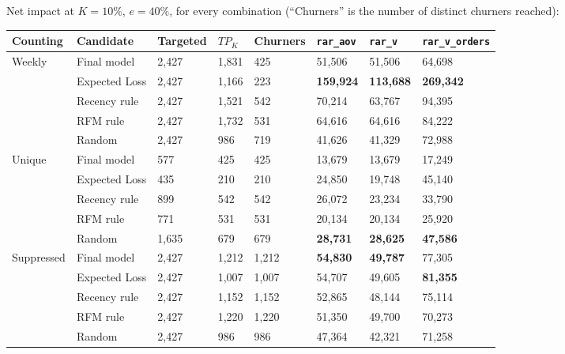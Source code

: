 Net impact at $K=10\%$, $e=40\%$, for every combination (``Churners'' is the number of distinct churners reached):

\begin{center}
\footnotesize
\setlength{\tabcolsep}{4pt}
\begin{tabular}{@{}p{1.6cm}p{2.2cm}p{1.3cm}p{1.1cm}p{1.4cm}p{1.8cm}p{1.8cm}p{2cm}@{}}
    \toprule
    Counting & Candidate & Targeted & $TP_K$ & Churners & \texttt{rar\_aov} & \texttt{rar\_v} & \texttt{rar\_v\_orders} \\
    \midrule
    Weekly & Final model & 2,427 & 1,831 & 425 & 51,506 & 51,506 & 64,698 \\
     & Expected Loss & 2,427 & 1,166 & 223 & \textbf{159,924} & \textbf{113,688} & \textbf{269,342} \\
     & Recency rule & 2,427 & 1,521 & 542 & 70,214 & 63,767 & 94,395 \\
     & RFM rule & 2,427 & 1,732 & 531 & 64,616 & 64,616 & 84,222 \\
     & Random & 2,427 & 986 & 719 & 41,626 & 41,329 & 72,988 \\
    \midrule
    Unique & Final model & 577 & 425 & 425 & 13,679 & 13,679 & 17,249 \\
     & Expected Loss & 435 & 210 & 210 & 24,850 & 19,748 & 45,140 \\
     & Recency rule & 899 & 542 & 542 & 26,072 & 23,234 & 33,790 \\
     & RFM rule & 771 & 531 & 531 & 20,134 & 20,134 & 25,920 \\
     & Random & 1,635 & 679 & 679 & \textbf{28,731} & \textbf{28,625} & \textbf{47,586} \\
    \midrule
    Suppressed & Final model & 2,427 & 1,212 & 1,212 & \textbf{54,830} & \textbf{49,787} & 77,305 \\
     & Expected Loss & 2,427 & 1,007 & 1,007 & 54,707 & 49,605 & \textbf{81,355} \\
     & Recency rule & 2,427 & 1,152 & 1,152 & 52,865 & 48,144 & 75,114 \\
     & RFM rule & 2,427 & 1,220 & 1,220 & 51,350 & 49,700 & 70,273 \\
     & Random & 2,427 & 986 & 986 & 47,364 & 42,321 & 71,258 \\
    \bottomrule
\end{tabular}
\end{center}

